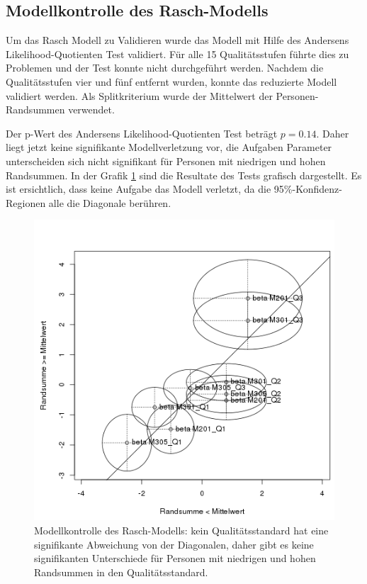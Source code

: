 

\subsection{Modellkontrolle des Rasch-Modells}

Um das Rasch Modell zu Validieren wurde das Modell mit Hilfe des Andersens Likelihood-Quotienten Test validiert. Für alle 15 Qualitätsstufen führte dies zu Problemen und der Test konnte nicht durchgeführt werden. Nachdem die Qualitätsstufen vier und fünf entfernt wurden, konnte das reduzierte Modell validiert werden. Als Splitkriterium wurde der Mittelwert der Personen-Randsummen verwendet. 

Der p-Wert des Andersens Likelihood-Quotienten Test beträgt $p=0.14$. Daher liegt jetzt keine signifikante Modellverletzung vor, die Aufgaben Parameter unterscheiden sich nicht signifikant für Personen mit niedrigen und hohen Randsummen. In der Grafik \ref{fig:RaschKontrolle} sind die Resultate des Tests grafisch dargestellt. Es ist ersichtlich, dass keine Aufgabe das Modell verletzt, da die 95\%-Konfidenz-Regionen alle die Diagonale berühren.


\begin{figure}[htbp]

\centering
\includegraphics[width=0.8\linewidth]{graphics/GOFQ.png}
\caption{Modellkontrolle des Rasch-Modells: kein Qualitätsstandard hat eine signifikante Abweichung von der Diagonalen, daher gibt es keine signifikanten Unterschiede für Personen mit niedrigen und hohen Randsummen in den Qualitätsstandard. }
\label{fig:RaschKontrolle}
\end{figure}

